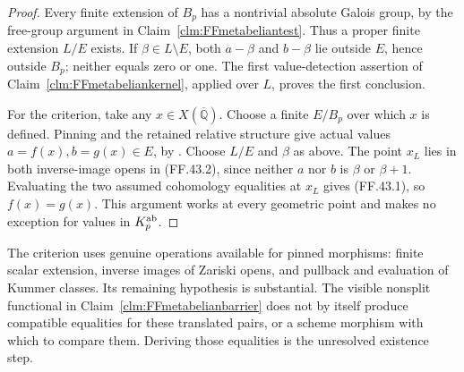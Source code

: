 \begin{proof}
Every finite extension of \(B_p\)
has a nontrivial absolute Galois
group, by the free-group argument
in Claim~\ref{clm:FFmetabeliantest}.
Thus a proper finite extension
\(L/E\) exists. If
\(\beta\in L\setminus E\), both
\(a-\beta\) and \(b-\beta\)
lie outside \(E\), hence outside
\(B_p\); neither equals zero or
one. The first value-detection
assertion of
Claim~\ref{clm:FFmetabeliankernel},
applied over \(L\), proves the
first conclusion.

For the criterion, take any
\(x\in X(\overline{\mathbb Q})\).
Choose a finite \(E/B_p\) over
which \(x\) is defined. Pinning
and the retained relative structure
give actual values
\(a=f(x),b=g(x)\in E\), by
\citep[Proposition~3.6]{FF_CHW2024}.
Choose \(L/E\) and \(\beta\)
as above. The point \(x_L\)
lies in both inverse-image opens
in (FF.43.2), since neither \(a\)
nor \(b\) is \(\beta\) or
\(\beta+1\). Evaluating the two
assumed cohomology equalities at
\(x_L\) gives (FF.43.1), so
\(f(x)=g(x)\). This argument
works at every geometric point
and makes no exception for values
in \(K_p^{\rm ab}\).
\end{proof}

The criterion uses genuine operations
available for pinned morphisms:
finite scalar extension, inverse images
of Zariski opens, and pullback and
evaluation of Kummer classes. Its
remaining hypothesis is substantial.
The visible nonsplit functional in
Claim~\ref{clm:FFmetabelianbarrier}
does not by itself produce compatible
equalities for these translated pairs,
or a scheme morphism with which to
compare them. Deriving those equalities
is the unresolved existence step.


